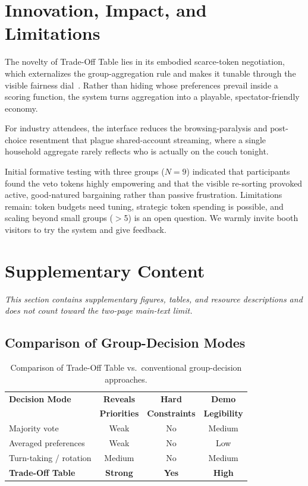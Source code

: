 \documentclass[sigconf]{acmart}
\begin{document}
\section{Innovation, Impact, and Limitations}
The novelty of Trade-Off Table lies in its embodied scarce-token negotiation, which externalizes the group-aggregation rule and makes it tunable through the visible fairness dial~\cite{tintarev2012evaluating}. Rather than hiding whose preferences prevail inside a scoring function, the system turns aggregation into a playable, spectator-friendly economy.

For industry attendees, the interface reduces the browsing-paralysis and post-choice resentment that plague shared-account streaming, where a single household aggregate rarely reflects who is actually on the couch tonight.

Initial formative testing with three groups ($N{=}9$) indicated that participants found the veto tokens highly empowering and that the visible re-sorting provoked active, good-natured bargaining rather than passive frustration. Limitations remain: token budgets need tuning, strategic token spending is possible, and scaling beyond small groups ($>$5) is an open question. We warmly invite booth visitors to try the system and give feedback.

\clearpage




\section*{Supplementary Content}
\emph{This section contains supplementary figures, tables, and resource descriptions and does not count toward the two-page main-text limit.}

\subsection*{Comparison of Group-Decision Modes}

\begin{table}[h]
\centering
\small
\begin{tabular}{lccc}
\toprule
\textbf{Decision Mode} & \textbf{Reveals} & \textbf{Hard} & \textbf{Demo} \\
                        & \textbf{Priorities} & \textbf{Constraints} & \textbf{Legibility} \\
\midrule
Majority vote           & Weak   & No  & Medium \\
Averaged preferences    & Weak   & No  & Low    \\
Turn-taking / rotation  & Medium & No  & Medium \\
\textbf{Trade-Off Table}& \textbf{Strong} & \textbf{Yes} & \textbf{High} \\
\bottomrule
\end{tabular}
\caption{Comparison of Trade-Off Table vs.\ conventional group-decision approaches.}
\label{tab:comparison}
\end{table}
\end{document}
